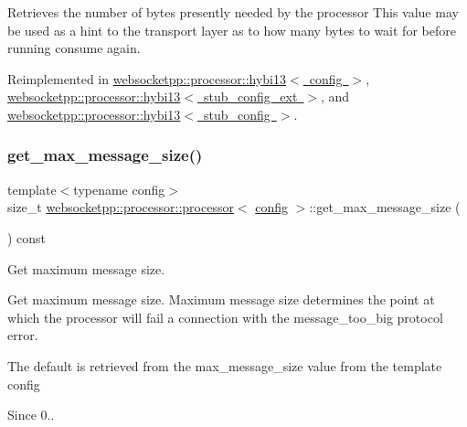 Retrieves the number of bytes presently needed by the processor This value may be used as a hint to the transport layer as to how many bytes to wait for before running consume again. 

Reimplemented in \mbox{\hyperlink{classwebsocketpp_1_1processor_1_1hybi13_a0e7fbb706a341f7d125c27e7ef001d92}{websocketpp\+::processor\+::hybi13$<$ config $>$}}, \mbox{\hyperlink{classwebsocketpp_1_1processor_1_1hybi13_a0e7fbb706a341f7d125c27e7ef001d92}{websocketpp\+::processor\+::hybi13$<$ stub\+\_\+config\+\_\+ext $>$}}, and \mbox{\hyperlink{classwebsocketpp_1_1processor_1_1hybi13_a0e7fbb706a341f7d125c27e7ef001d92}{websocketpp\+::processor\+::hybi13$<$ stub\+\_\+config $>$}}.

\mbox{\label{classwebsocketpp_1_1processor_1_1processor_ade6eea6e4c97065030ed9106613d47f9}} 
\subsubsection{\texorpdfstring{get\+\_\+max\+\_\+message\+\_\+size()}{get\_max\_message\_size()}}
{\footnotesize\ttfamily template$<$typename config$>$ \\
size\+\_\+t \mbox{\hyperlink{classwebsocketpp_1_1processor_1_1processor}{websocketpp\+::processor\+::processor}}$<$ \mbox{\hyperlink{classconfig}{config}} $>$\+::get\+\_\+max\+\_\+message\+\_\+size (\begin{DoxyParamCaption}{ }\end{DoxyParamCaption}) const\hspace{0.3cm}{\ttfamily [inline]}}



Get maximum message size. 

Get maximum message size. Maximum message size determines the point at which the processor will fail a connection with the message\+\_\+too\+\_\+big protocol error.

The default is retrieved from the max\+\_\+message\+\_\+size value from the template config

\begin{DoxySince}{Since}
0.. 
\end{DoxySince}
\mbox{\label{classwebsocketpp_1_1processor_1_1processor_afb9477aa9e49a7dca59d684277b66932}} 
